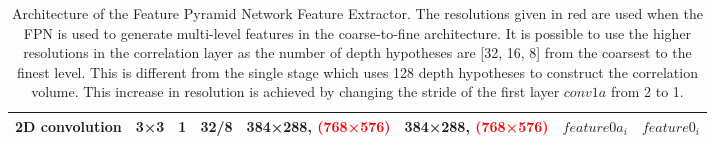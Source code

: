 \begin{table}[htbp]
\begin{adjustbox}{width=1\textwidth}
\begin{tabular}{|l|c|c|c|c|c|c|c|}
\hspace{0.75cm}2D convolution                            & 3×3             & 1               & 32/8        & 384×288, \textcolor{red}{(768×576)}           & 384×288, \textcolor{red}{(768×576)}            & $feature0a_{i}$            & $feature0_{i}$         \\ \hline
\end{tabular}
\end{adjustbox}
\caption[Architecture of the Feature Pyramid Network Feature Extractor.]{Architecture of the Feature Pyramid Network Feature Extractor. The resolutions given in red are used when the FPN is used to generate multi-level features in the coarse-to-fine architecture. It is possible to use the higher resolutions in the correlation layer as the number of depth hypotheses are [32, 16, 8] from the coarsest to the finest level. This is different from the single stage {\mvsn} which uses 128 depth hypotheses to construct the correlation volume. This increase in resolution is achieved by changing the stride of the first layer $conv1a$ from 2 to 1.
}
\label{tab:arch-fpn}
\end{table}